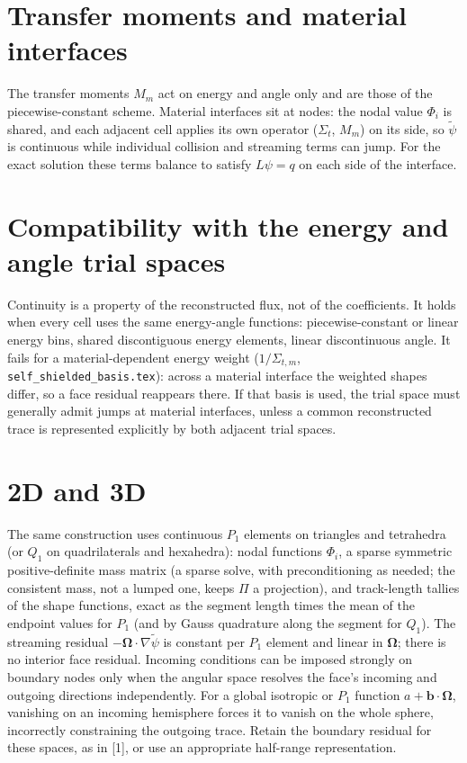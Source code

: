 \documentclass[11pt]{article}
\newcommand{\tpsi}{\tilde\psi}
\newcommand{\Sigt}{\Sigma_t}
\begin{document}
\section{Transfer moments and material interfaces}

The transfer moments $M_{m}$ act on energy and angle only and are those of the
piecewise-constant scheme. Material interfaces sit at nodes: the nodal value
$\Phi_i$ is shared, and each adjacent cell applies its own operator ($\Sigt$,
$M_m$) on its side, so $\tpsi$ is continuous while individual collision and
streaming terms can jump. For the exact solution these terms balance to satisfy
$L\psi=q$ on each side of the interface.

\section{Compatibility with the energy and angle trial spaces}

Continuity is a property of the reconstructed flux, not of the coefficients. It holds
when every cell uses the same energy-angle functions: piecewise-constant or linear
energy bins, shared discontiguous energy elements, linear discontinuous angle. It fails
for a material-dependent energy weight ($1/\Sigma_{t,m}$,
\texttt{self\_shielded\_basis.tex}): across a material interface the weighted shapes
differ, so a face residual reappears there. If that basis is used, the trial space must
generally admit jumps at material interfaces, unless a common reconstructed
trace is represented explicitly by both adjacent trial spaces.

\section{2D and 3D}

The same construction uses continuous $P_1$ elements on triangles and tetrahedra (or
$Q_1$ on quadrilaterals and hexahedra): nodal functions $\Phi_i$, a sparse symmetric
positive-definite mass matrix (a sparse solve, with preconditioning as needed;
the consistent mass, not a lumped one, keeps $\Pi$ a projection), and track-length
tallies of the shape functions, exact as the segment length times the mean of the
endpoint values for $P_1$ (and by Gauss quadrature along the segment for $Q_1$). The
streaming residual $-\boldsymbol\Omega\cdot\nabla\tpsi$ is constant per $P_1$ element
and linear in $\boldsymbol\Omega$; there is no interior face residual.
Incoming conditions can be imposed strongly on boundary nodes only when the
angular space resolves the face's incoming and outgoing directions independently.
For a global isotropic or $P_1$ function $a+\mathbf b\cdot\boldsymbol\Omega$,
vanishing on an incoming hemisphere forces it to vanish on the whole sphere,
incorrectly constraining the outgoing trace. Retain the boundary residual for
these spaces, as in [1], or use an appropriate half-range representation.
\end{document}
